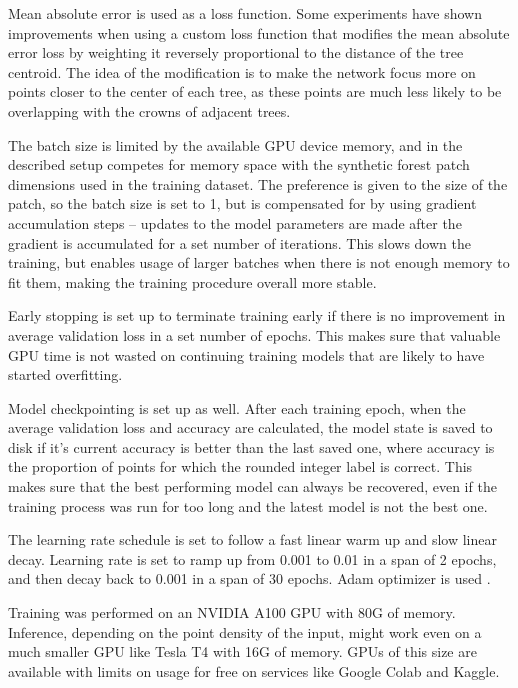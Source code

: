 Mean absolute error is used as a loss function.
Some experiments have shown improvements when using a custom loss function that modifies the mean absolute error loss by weighting it reversely proportional to the distance of the tree centroid.
The idea of the modification is to make the network focus more on points closer to the center of each tree, as these points are much less likely to be overlapping with the crowns of adjacent trees.

The batch size is limited by the available GPU device memory, and in the described setup competes for memory space with the synthetic forest patch dimensions used in the training dataset.
The preference is given to the size of the patch, so the batch size is set to 1, but is compensated for by using gradient accumulation steps – updates to the model parameters are made after the gradient is accumulated for a set number of iterations.
This slows down the training, but enables usage of larger batches when there is not enough memory to fit them, making the training procedure overall more stable.

Early stopping \citep{precheltAutomaticEarlyStopping1998} is set up to terminate training early if there is no improvement in average validation loss in a set number of epochs.
This makes sure that valuable GPU time is not wasted on continuing training models that are likely to have started overfitting.

Model checkpointing is set up as well.
After each training epoch, when the average validation loss and accuracy are calculated, the model state is saved to disk if it's current accuracy is better than the last saved one, where accuracy is the proportion of points for which the rounded integer label is correct.
This makes sure that the best performing model can always be recovered, even if the training process was run for too long and the latest model is not the best one.

The learning rate schedule is set to follow a fast linear warm up and slow linear decay.
Learning rate is set to ramp up from 0.001 to 0.01 in a span of 2 epochs, and then decay back to 0.001 in a span of 30 epochs.
Adam optimizer is used \citep{kingmaAdamMethodStochastic2014}.

Training was performed on an NVIDIA A100 GPU with 80G of memory.
Inference, depending on the point density of the input, might work even on a much smaller GPU like Tesla T4 with 16G of memory.
GPUs of this size are available with limits on usage for free on services like Google Colab and Kaggle.

